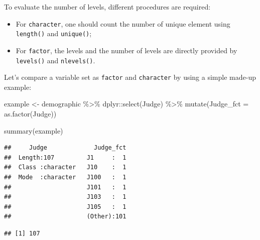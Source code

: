 \documentclass[
]{krantz}
\makeatletter
\newenvironment{Shaded}{\begin{snugshade}}{\end{snugshade}}
\newcommand{\AttributeTok}[1]{\textcolor[rgb]{0.61,0.61,0.61}{#1}}
\newcommand{\CommentTok}[1]{\textcolor[rgb]{0.37,0.37,0.37}{\textit{#1}}}
\newcommand{\FunctionTok}[1]{\textcolor[rgb]{0,0,0}{#1}}
\newcommand{\NormalTok}[1]{#1}
\newcommand{\OtherTok}[1]{\textcolor[rgb]{0.37,0.37,0.37}{#1}}
\newcommand{\SpecialCharTok}[1]{\textcolor[rgb]{0,0,0}{#1}}
\providecommand{\tightlist}{%
  \setlength{\itemsep}{0pt}\setlength{\parskip}{0pt}}
\newenvironment{kframe}{%
\medskip{}
\setlength{\fboxsep}{.8em}
 \def\at@end@of@kframe{}%
 \ifinner\ifhmode%
  \def\at@end@of@kframe{\end{minipage}}%
  \begin{minipage}{\columnwidth}%
 \fi\fi%
 \def\FrameCommand##1{\hskip\@totalleftmargin \hskip-\fboxsep
 \colorbox{shadecolor}{##1}\hskip-\fboxsep
     \hskip-\linewidth \hskip-\@totalleftmargin \hskip\columnwidth}%
 \MakeFramed {\advance\hsize-\width
   \@totalleftmargin\z@ \linewidth\hsize
   \@setminipage}}%
 {\par\unskip\endMakeFramed%
 \at@end@of@kframe}
\renewenvironment{Shaded}{\begin{kframe}}{\end{kframe}}
\makeatother
\begin{document}
To evaluate the number of levels, different procedures are required:

\begin{itemize}
\tightlist
\item
  For \texttt{character}, one should count the number of unique element using \texttt{length()} and \texttt{unique()};
\item
  For \texttt{factor}, the levels and the number of levels are directly provided by \texttt{levels()} and \texttt{nlevels()}.
\end{itemize}

Let's compare a variable set as \texttt{factor} and \texttt{character} by using a simple made-up example:

\begin{Shaded}
\begin{Highlighting}[]
\NormalTok{example }\OtherTok{\textless{}{-}}\NormalTok{ demographic }\SpecialCharTok{\%\textgreater{}\%} 
\NormalTok{  dplyr}\SpecialCharTok{::}\FunctionTok{select}\NormalTok{(Judge) }\SpecialCharTok{\%\textgreater{}\%} 
  \FunctionTok{mutate}\NormalTok{(}\AttributeTok{Judge\_fct =} \FunctionTok{as.factor}\NormalTok{(Judge))}

\FunctionTok{summary}\NormalTok{(example)}
\end{Highlighting}
\end{Shaded}

\begin{verbatim}
##     Judge             Judge_fct  
##  Length:107         J1     :  1  
##  Class :character   J10    :  1  
##  Mode  :character   J100   :  1  
##                     J101   :  1  
##                     J103   :  1  
##                     J105   :  1  
##                     (Other):101
\end{verbatim}

\begin{Shaded}
\end{Shaded}

\begin{verbatim}
## [1] 107
\end{verbatim}

\begin{Shaded}
\end{Shaded}
\end{document}
